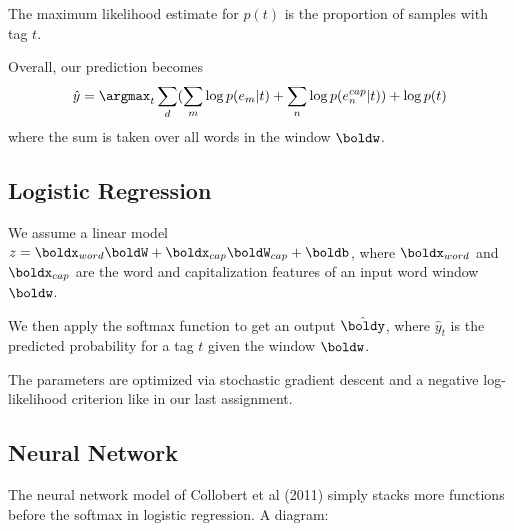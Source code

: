\documentclass[11pt]{article}
\begin{document}
The maximum likelihood estimate for $p(t)$ is the proportion of samples with tag $t$. 

Overall, our prediction becomes
$$\hat{y} = \argmax_t \sum_d (\sum_m \log p(e_m | t) + \sum_n \log p(e^{cap}_n | t)) + \log p(t)$$
where the sum is taken over all words in the window $\boldw$. 

\subsection{Logistic Regression}

We assume a linear model $z = \boldx_{word} \boldW + \boldx_{cap} \boldW_{cap} + \boldb$, where $\boldx_{word}$ and $\boldx_{cap}$ are the word and capitalization features of an input word window $\boldw$. 

We then apply the softmax function to get an output $\hat{\boldy}$, where $\hat{y}_t$ is the predicted probability for a tag $t$ given the window $\boldw$. 
%

The parameters are optimized via stochastic gradient descent and a negative log-likelihood criterion like in our last assignment. 

\subsection{Neural Network}

The neural network model of Collobert et al (2011) simply stacks more functions before the softmax in logistic regression. A diagram:
\end{document}
